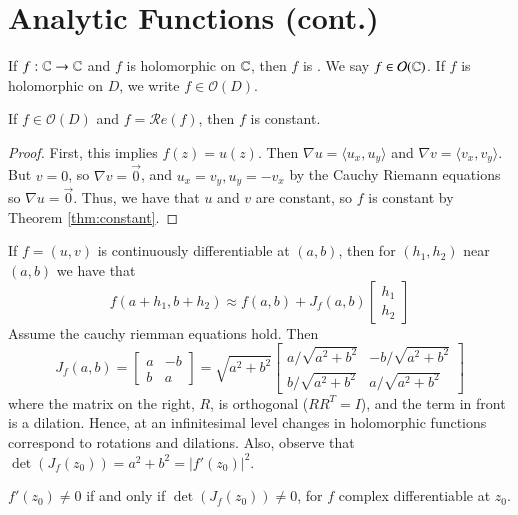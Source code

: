 \documentclass[12pt, a4paper, oneside, openright, titlepage]{book}
\begin{document}
\section{Analytic Functions (cont.)}

\begin{defn}
    If $f:\mathbb C\rightarrow \mathbb C$ and $f$ is holomorphic on $\mathbb C$, then $f$ is . We say $f \in \mathcal{O}(\mathbb C)$. If $f$ is holomorphic on $D$, we write $f \in \mathcal{O}(D)$.
\end{defn}


\begin{thm}
    If $f \in \mathcal{O}(D)$ and $f = \mathscr{R}e(f)$, then $f$ is constant.
\end{thm}
\begin{proof}
    First, this implies $f(z) = u(z)$. Then $\nabla u = \langle u_x,u_y\rangle$ and $\nabla v = \langle v_x, v_y\rangle$. But $v = 0$, so $\nabla v = \vec{0}$, and $u_x = v_y, u_y = -v_x$ by the Cauchy Riemann equations so $\nabla u = \vec{0}$. Thus, we have that $u$ and $v$ are constant, so $f$ is constant by Theorem \ref{thm:constant}.
\end{proof}

If $f = (u,v)$ is continuously differentiable at $(a,b)$, then for $(h_1,h_2)$ near $(a,b)$ we have that \begin{equation*}
    f(a+h_1,b+h_2) \approx f(a,b) + J_f(a,b)\begin{bmatrix} h_1 \\ h_2 \end{bmatrix}
\end{equation*}
Assume the cauchy riemman equations hold. Then \begin{equation*}
    J_f(a,b) = \begin{bmatrix} a & -b \\ b & a \end{bmatrix} = \sqrt{a^2+b^2}\begin{bmatrix} a/\sqrt{a^2+b^2} & -b/\sqrt{a^2+b^2} \\ b/\sqrt{a^2+b^2} & a/\sqrt{a^2+b^2} \end{bmatrix}
\end{equation*}
where the matrix on the right, $R$, is orthogonal ($RR^T = I$), and the term in front is a dilation. Hence, at an infinitesimal level changes in holomorphic functions correspond to rotations and dilations. Also, observe that $\det(J_f(z_0)) = a^2+b^2 = |f'(z_0)|^2$.

\begin{thm}
    $f'(z_0) \neq 0$ if and only if $\det(J_f(z_0)) \neq 0$, for $f$ complex differentiable at $z_0$. 
\end{thm}
\end{document}
